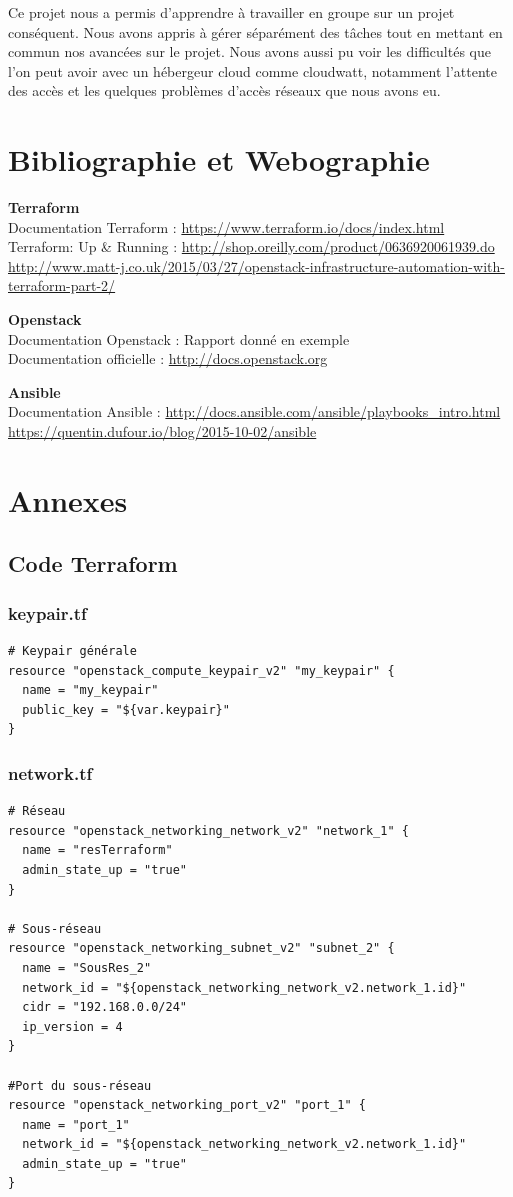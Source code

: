 \documentclass[]{article}
\begin{document}
Ce projet nous a permis d'apprendre à travailler en groupe sur un projet conséquent. Nous avons appris à gérer séparément des tâches tout en mettant en commun nos avancées sur le projet. Nous avons aussi pu voir les difficultés que l'on peut avoir avec un hébergeur cloud comme cloudwatt, notamment l'attente des accès et les quelques problèmes d'accès réseaux que nous avons eu.

\newpage
\section{Bibliographie et Webographie}
\textbf{Terraform}\\
Documentation Terraform : \url{https://www.terraform.io/docs/index.html} \\
Terraform: Up \& Running : \url{http://shop.oreilly.com/product/0636920061939.do } \\
\url{http://www.matt-j.co.uk/2015/03/27/openstack-infrastructure-automation-with-terraform-part-2/}

\textbf{Openstack}\\
Documentation Openstack : Rapport donné en exemple \\
Documentation officielle : \url{http://docs.openstack.org}

\textbf{Ansible}\\
Documentation Ansible : \url{http://docs.ansible.com/ansible/playbooks_intro.html}\\
\url{https://quentin.dufour.io/blog/2015-10-02/ansible}

\newpage
\section{Annexes}
\subsection*{Code Terraform}
\subsubsection*{keypair.tf}
\begin{verbatim}
# Keypair générale
resource "openstack_compute_keypair_v2" "my_keypair" {
  name = "my_keypair"
  public_key = "${var.keypair}"
}
\end{verbatim}

\subsubsection*{network.tf}
\begin{verbatim}
# Réseau
resource "openstack_networking_network_v2" "network_1" {
  name = "resTerraform"
  admin_state_up = "true"
}

# Sous-réseau
resource "openstack_networking_subnet_v2" "subnet_2" {
  name = "SousRes_2"
  network_id = "${openstack_networking_network_v2.network_1.id}"
  cidr = "192.168.0.0/24"
  ip_version = 4 
}

#Port du sous-réseau
resource "openstack_networking_port_v2" "port_1" {
  name = "port_1"
  network_id = "${openstack_networking_network_v2.network_1.id}"
  admin_state_up = "true"
}
\end{verbatim}
\end{document}
